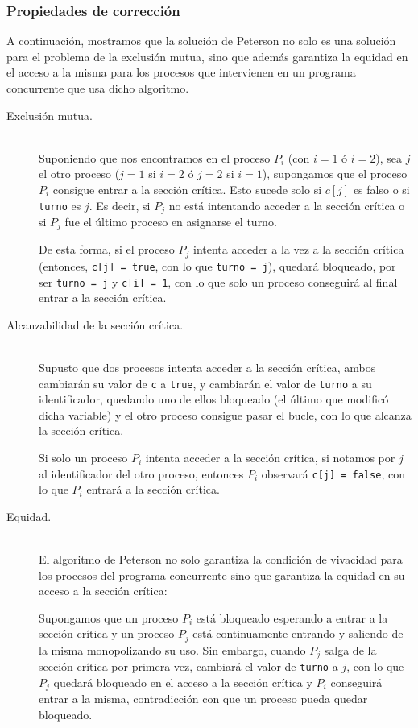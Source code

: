 \subsubsection{Propiedades de corrección}
A continuación, mostramos que la solución de Peterson no solo es una solución para el problema de la exclusión mutua, sino que además garantiza la equidad en el acceso a la misma para los procesos que intervienen en un programa concurrente que usa dicho algoritmo.
\begin{description}
    \item [Exclusión mutua.]~\\
        Suponiendo que nos encontramos en el proceso $P_i$ (con $i=1$ ó $i=2$), sea $j$ el otro proceso ($j =1$ si $i=2$ ó $j=2$ si $i=1$), supongamos que el proceso $P_i$ consigue entrar a la sección crítica. Esto sucede solo si $c[j]$ es falso o si \verb|turno| es $j$. Es decir, si $P_j$ no está intentando acceder a la sección crítica o si $P_j$ fue el último proceso en asignarse el turno. 

        De esta forma, si el proceso $P_j$ intenta acceder a la vez a la sección crítica (entonces, \verb|c[j] = true|, con lo que \verb|turno = j|), quedará bloqueado, por ser \verb|turno = j| y \verb|c[i] = 1|, con lo que solo un proceso conseguirá al final entrar a la sección crítica.
    \item [Alcanzabilidad de la sección crítica.]~\\
        Supusto que dos procesos intenta acceder a la sección crítica, ambos cambiarán su valor de \verb|c| a \verb|true|, y cambiarán el valor de \verb|turno| a su identificador, quedando uno de ellos bloqueado (el último que modificó dicha variable) y el otro proceso consigue pasar el bucle, con lo que alcanza la sección crítica.

        Si solo un proceso $P_i$ intenta acceder a la sección crítica, si notamos por $j$ al identificador del otro proceso, entonces $P_i$ observará \verb|c[j] = false|, con lo que $P_i$ entrará a la sección crítica.
    \item [Equidad.]~\\
        El algoritmo de Peterson no solo garantiza la condición de vivacidad para los procesos del programa concurrente sino que garantiza la equidad en su acceso a la sección crítica:

        Supongamos que un proceso $P_i$ está bloqueado esperando a entrar a la sección crítica y un proceso $P_j$ está continuamente entrando y saliendo de la misma monopolizando su uso. Sin embargo, cuando $P_j$ salga de la sección crítica por primera vez, cambiará el valor de \verb|turno| a $j$, con lo que $P_j$ quedará bloqueado en el acceso a la sección crítica y $P_i$ conseguirá entrar a la misma, contradicción con que un proceso pueda quedar bloqueado.
\end{description}

